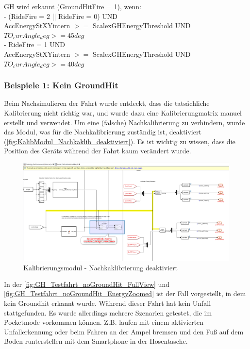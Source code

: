 GH wird erkannt (GroundHitFire = 1), wenn:\\
-	(RideFire = 2 || RideFire = 0) UND \\
AccEnergyStXYintern $>=$ ScalexGHEnergyThreshold UND\\
$TO_curAngle_deg >=45 deg$\\

-	RideFire = 1 UND \\
AccEnergyStXYintern $>=$ ScalexGHEnergyThreshold UND\\
$TO_curAngle_deg >=40 deg$

\subsubsection{Beispiele 1: Kein GroundHit}
Beim Nachsimulieren der Fahrt wurde entdeckt, dass die tatsächliche Kalibrierung nicht richtig war, und wurde dazu eine Kalibrierungmatrix manuel erstellt und verwendet. Um eine (falsche) Nachkalibrierung zu verhindern, wurde das Modul, was für die Nachkalibrierung zuständig ist, deaktiviert (\autoref{fig:KalibModul_Nachkaklib_deaktiviert}). Es ist wichtig zu wissen, dass die Position des Geräts während der Fahrt kaum verändert wurde.

\begin{figure}[H]
	\centering
	\includegraphics[width=\linewidth]{Bilder/KalibModul_Nachkaklib_deaktiviert.png}
	\caption{Kalibrierungsmodul - Nachkaklibrierung deaktiviert}
	\label{fig:KalibModul_Nachkaklib_deaktiviert}
\end{figure}
In der \autoref{fig:GH_Testfahrt_noGroundHit_FullView} und \autoref{fig:GH_Testfahrt_noGroundHit_EnergyZoomed} ist der Fall vorgestellt, in dem kein Groundhit erkannt wurde. Während dieser Fahrt hat kein Unfall stattgefunden. Es wurde allerdings mehrere Szenarien getestet, die im Pocketmode vorkommen können. Z.B. laufen mit einem aktivierten Unfallerkennung oder beim Fahren an der Ampel bremsen und den Fuß auf dem Boden runterstellen mit dem Smartphone in der Hosentasche.

